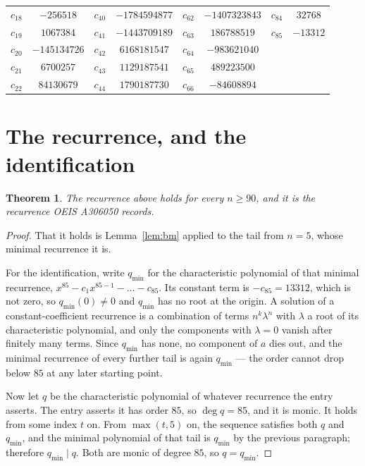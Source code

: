 \documentclass[11pt,a4paper]{article}
\theoremstyle{plain}
\newtheorem{theorem}{Theorem}
\theoremstyle{definition}
\begin{document}
\begin{center}
\begin{tabular}{cccccccc}
$c_{18}$ & $-256518$ & $c_{40}$ & $-1784594877$ & $c_{62}$ & $-1407323843$ & $c_{84}$ & $32768$ \\
$c_{19}$ & $1067384$ & $c_{41}$ & $-1443709189$ & $c_{63}$ & $186788519$ & $c_{85}$ & $-13312$ \\
$c_{20}$ & $-145134726$ & $c_{42}$ & $6168181547$ & $c_{64}$ & $-983621040$ &  &  \\
$c_{21}$ & $6700257$ & $c_{43}$ & $1129187541$ & $c_{65}$ & $489223500$ &  &  \\
$c_{22}$ & $84130679$ & $c_{44}$ & $1790187730$ & $c_{66}$ & $-84608894$ &  &  \\
\end{tabular}
\end{center}

\section{The recurrence, and the identification}

\begin{theorem}
The recurrence above holds for every $n\ge90$, and it is the recurrence OEIS A306050 records.
\end{theorem}

\begin{proof}
That it holds is Lemma~\ref{lem:bm} applied to the tail from $n=5$, whose minimal
recurrence it is.

For the identification, write $q_{\min}$ for the characteristic polynomial of that minimal
recurrence, $x^{85}-c_1x^{85-1}-\dots-c_{85}$. Its constant term is
$-c_{85}=13312$, which is not zero, so $q_{\min}(0)\neq0$ and $q_{\min}$ has no
root at the origin. A solution of a constant-coefficient recurrence is a combination of terms
$n^{k}\lambda^{n}$ with $\lambda$ a root of its characteristic polynomial, and only the
components with $\lambda=0$ vanish after finitely many terms. Since $q_{\min}$ has none, no
component of $a$ dies out, and the minimal recurrence of every further tail is again
$q_{\min}$ --- the order cannot drop below $85$ at any later starting point.

Now let $q$ be the characteristic polynomial of whatever recurrence the entry asserts. The
entry asserts it has order $85$, so $\deg q=85$, and it is monic. It holds from some
index $t$ on. From $\max(t,5)$ on, the sequence satisfies both $q$ and $q_{\min}$, and
the minimal polynomial of that tail is $q_{\min}$ by the previous paragraph; therefore
$q_{\min}\mid q$. Both are monic of degree $85$, so $q=q_{\min}$.
\end{proof}
\end{document}
